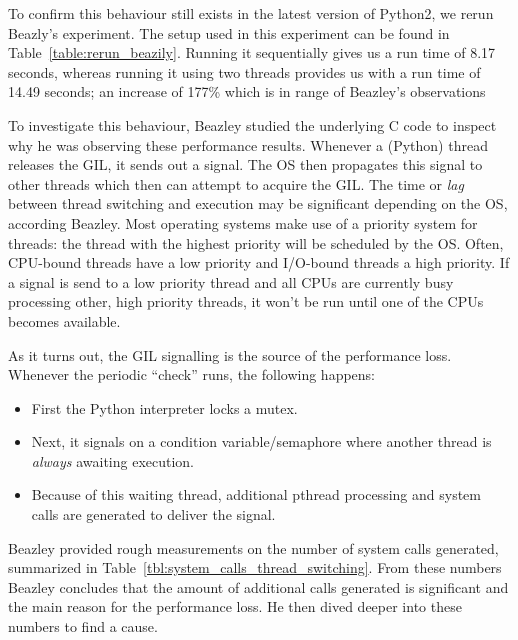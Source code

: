 To confirm this behaviour still exists in the latest version of Python2, we rerun Beazly's experiment.
The setup used in this experiment can be found in Table~\ref{table:rerun_beazily}.
Running it sequentially gives us a run time of 8.17 seconds, whereas running it using two threads provides us with a run time of 14.49 seconds; an increase of 177\% which is in range of Beazley's observations

To investigate this behaviour, Beazley studied the underlying C code to inspect why he was observing these performance results.
Whenever a (Python) thread releases the GIL, it sends out a signal.
The OS then propagates this signal to other threads which then can attempt to acquire the GIL.
The time or \emph{lag} between thread switching and execution may be significant depending on the OS, according Beazley.
Most operating systems make use of a priority system for threads: the thread with the highest priority will be scheduled by the OS.
Often, CPU-bound threads have a low priority and I/O-bound threads a high priority.
If a signal is send to a low priority thread and all CPUs are currently busy processing other, high priority threads, it won't be run until one of the CPUs becomes available.

As it turns out, the GIL signalling is the source of the performance loss.
Whenever the periodic \enquote{check} runs, the following happens:

\begin{itemize}
	\item First the Python interpreter locks a mutex.
	\item Next, it signals on a condition variable/semaphore where another thread is \emph{always} awaiting execution.
	\item Because of this waiting thread, additional pthread processing and system calls are generated to deliver the signal.
\end{itemize}

Beazley provided rough measurements on the number of system calls generated, summarized in Table~\ref{tbl:system_calls_thread_switching}.
From these numbers Beazley concludes that the amount of additional calls generated is significant and the main reason for the performance loss.
He then dived deeper into these numbers to find a cause.


